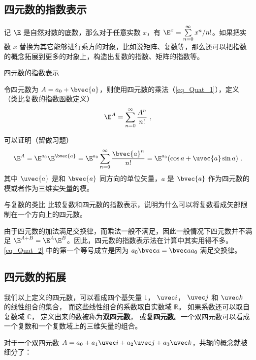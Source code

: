 \subsection{四元数的指数表示}

记 $\E$ 是自然对数的底数，那么对于任意实数 $x$，有 $\E^x = \sum^\infty\limits_{n=0} x^n / n!$。如果把实数 $x$ 替换为其它能够进行乘方的对象，比如说矩阵、复数等，那么还可以把指数的概念拓展到更多的对象上，构造出复数的指数、矩阵的指数等。

\begin{definition}{四元数的指数表示}

令四元数为 $A=a_0+\bvec{a}$，则使用四元数的乘法（\autoref{eq_Quat_1}），定义（类比复数的指数函数定义）
\begin{equation}\label{eq_Quat_2}
\E^A = \sum^\infty\limits_{n=0}\frac{A^n}{n!}~,
\end{equation}
\end{definition}
可以证明（留做习题）
\begin{equation}
\E^A = \E^{a_0}\E^{\bvec{a}}=\E^{a_0}\sum^\infty\limits_{n=0}\frac{\bvec{a}^n}{n!}=\E^{a_0}(\cos{a}+ \uvec{a}\sin a)~.
\end{equation}
其中 $\uvec{a}$ 是和 $\bvec{a}$ 同方向的单位矢量，$a$ 是 $\bvec{a}$ 作为四元数的模或者作为三维实矢量的模。

\begin{exercise}{与复数的类比}
比较复数和四元数的指数表示，说明为什么可以将复数看成矢部限制在一个方向上的四元数。
\end{exercise}

由于四元数的加法满足交换律，而乘法一般不满足，因此一般情况下四元数并不满足 $\E^{A+B} = \E^A \E^B$。因此，四元数的指数表示法在计算中其实用得不多。 \autoref{eq_Quat_2} 中的第一个等号成立是因为 $a_0\bvec a = \bvec a a_0$ 满足交换律。

\subsection{四元数的拓展}

我们以上定义的四元数，可以看成四个基矢量 $1$， $\uvec i$， $\uvec j$ 和 $\uvec k$ 的线性组合的集合， 而这些线性组合的系数取自实数域 $\mathbb R$。 如果系数还可以取自复数域 $\mathbb C$， 定义出来的数被称为\textbf{双四元数}， 或\textbf{复四元数}。一个双四元数可以看成一个复数和一个复数域上的三维矢量的组合。

对于一个双四元数 $A=a_0+a_1 \uvec i+a_2\uvec j+a_3\uvec k$，共轭的概念就被细分了：

